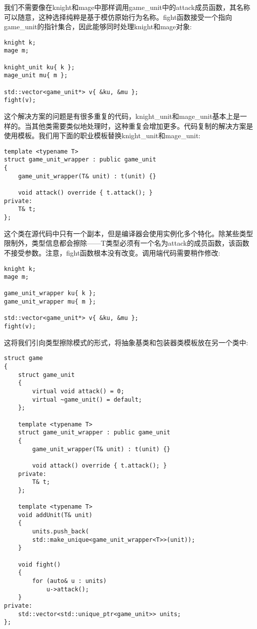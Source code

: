 我们不需要像在knight和mage中那样调用game\_unit中的attack成员函数，其名称可以随意，这种选择纯粹是基于模仿原始行为名称。fight函数接受一个指向game\_unit的指针集合，因此能够同时处理knight和mage对象:

\begin{lstlisting}[style=styleCXX]
knight k;
mage m;

knight_unit ku{ k };
mage_unit mu{ m };

std::vector<game_unit*> v{ &ku, &mu };
fight(v);
\end{lstlisting}

这个解决方案的问题是有很多重复的代码，knight\_unit和mage\_unit基本上是一样的。当其他类需要类似地处理时，这种重复会增加更多。代码复制的解决方案是使用模板。我们用下面的职业模板替换knight\_unit和mage\_unit:

\begin{lstlisting}[style=styleCXX]
template <typename T>
struct game_unit_wrapper : public game_unit
{
	game_unit_wrapper(T& unit) : t(unit) {}
	
	void attack() override { t.attack(); }
private:
	T& t;
};
\end{lstlisting}

这个类在源代码中只有一个副本，但是编译器会使用实例化多个特化。除某些类型限制外，类型信息都会擦除——T类型必须有一个名为attack的成员函数，该函数不接受参数。注意，fight函数根本没有改变。调用端代码需要稍作修改:

\begin{lstlisting}[style=styleCXX]
knight k;
mage m;

game_unit_wrapper ku{ k };
game_unit_wrapper mu{ m };

std::vector<game_unit*> v{ &ku, &mu };
fight(v);
\end{lstlisting}

这将我们引向类型擦除模式的形式，将抽象基类和包装器类模板放在另一个类中:

\begin{lstlisting}[style=styleCXX]
struct game
{
	struct game_unit
	{
		virtual void attack() = 0;
		virtual ~game_unit() = default;
	};

	template <typename T>
	struct game_unit_wrapper : public game_unit
	{
		game_unit_wrapper(T& unit) : t(unit) {}
		
		void attack() override { t.attack(); }
	private:
		T& t;
	};

	template <typename T>
	void addUnit(T& unit)
	{
		units.push_back(
		std::make_unique<game_unit_wrapper<T>>(unit));
	}

	void fight()
	{
		for (auto& u : units)
			u->attack();
	}
private:
	std::vector<std::unique_ptr<game_unit>> units;
};
\end{lstlisting}

